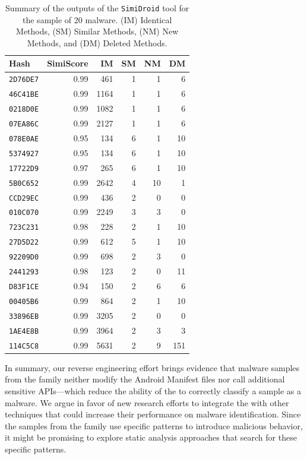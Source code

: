  
\begin{table}[ht]
  \centering
  \caption{Summary of the outputs of the \texttt{SimiDroid} tool for the sample of 20
    \gps malware. (IM) Identical Methods, (SM) Similar Methods, (NM) New Methods, and
    (DM) Deleted Methods.}
  \begin{tabular}{lrrrrr}
   \toprule
    Hash & SimiScore & IM & SM & NM & DM \\ 
   \midrule
   \texttt{2D76DE7} & 0.99 & 461 &    1 &   1 &   6 \\ 
   \texttt{46C41BE} & 0.99 & 1164 &   1 &   1 &   6 \\ 
   \texttt{0218D0E} & 0.99 & 1082 &   1 &   1 &   6 \\ 
   \texttt{07EA86C} & 0.99 & 2127 &   1 &   1 &   6 \\ 
   \texttt{078E0AE} & 0.95 & 134 &   6 &   1 &  10 \\ 
   \texttt{5374927} & 0.95 & 134 &   6 &   1 &  10 \\ 
   \texttt{17722D9} & 0.97 & 265 &   6 &   1 &  10 \\ 
   \texttt{5B0C652} & 0.99 & 2642 &   4 &  10 &   1 \\ 
   \texttt{CCD29EC} & 0.99 & 436 &   2 &   0 &   0 \\ 
   \texttt{010C070} & 0.99 & 2249 &   3 &   3 &   0 \\ 
   \texttt{723C231} & 0.98 & 228 &   2 &   1 &  10 \\ 
   \texttt{27D5D22} & 0.99 & 612 &   5 &   1 &  10 \\ 
   \texttt{92209D0} & 0.99 & 698 &   2 &   3 &   0 \\ 
   \texttt{2441293} & 0.98 & 123 &   2 &   0 &  11 \\ 
   \texttt{D83F1CE} & 0.94 & 150 &   2 &   6 &   6 \\ 
   \texttt{00405B6} & 0.99 & 864 &   2 &   1 &  10 \\ 
   \texttt{33896EB} & 0.99 & 3205 &   2 &   0 &   0 \\ 
   \texttt{1AE4E8B} & 0.99 & 3964 &   2 &   3 &   3 \\
   \texttt{114C5C8} & 0.99 & 5631 &   2 &   9 & 151 \\ 
   \bottomrule
 \end{tabular}
 \label{tab:simidroid-outputs}
\end{table}

In summary, our reverse engineering effort brings evidence that malware
samples from the \gps family neither modify the Android Manifest
files nor call additional sensitive APIs---which reduce the ability
of the \mas to correctly classify a sample as a malware. We argue in favor
of new research efforts to integrate the \mas 
with other techniques that could increase their performance
on malware identification. Since the samples from the \gps
family use specific patterns to introduce malicious behavior,
it might be promising to explore static analysis approaches that
search for these specific patterns. 

